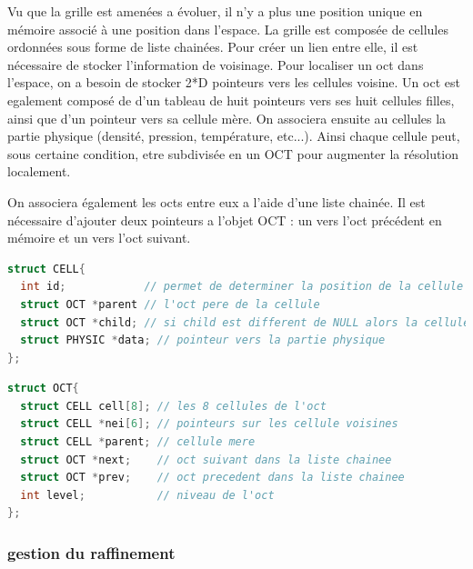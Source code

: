 Vu que la grille est amenées a évoluer, il n'y a plus une position unique en mémoire associé à une position dans l'espace.
La grille est composée de cellules ordonnées sous forme de liste chainées.
Pour créer un lien entre elle, il est nécessaire de stocker l'information de voisinage.
Pour localiser un oct dans l'espace, on a besoin de stocker 2*D pointeurs vers les cellules voisine.
Un oct est egalement composé de d'un tableau de huit pointeurs vers ses huit cellules filles,  ainsi que d'un pointeur vers sa cellule mère.
On associera ensuite au cellules la partie physique (densité, pression, température, etc...).
Ainsi chaque cellule peut, sous certaine condition, etre subdivisée en un OCT pour augmenter la résolution localement.


On associera également les octs entre eux a l'aide d'une liste chainée. 
Il est nécessaire d'ajouter deux pointeurs a l'objet OCT : un vers l'oct précédent en mémoire et un vers l'oct suivant.

\begin{lstlisting}[float=bth,language=C,frame=tb,caption={les structures cellule de EMMA},label=lst:cell]
struct CELL{
  int id;            // permet de determiner la position de la cellule dans l'oct
  struct OCT *parent // l'oct pere de la cellule
  struct OCT *child; // si child est different de NULL alors la cellule est raffinee et child point vers l'oct enfant
  struct PHYSIC *data; // pointeur vers la partie physique
};
\end{lstlisting}

\begin{lstlisting}[float=bth,language=C,frame=tb,caption={les structures OCT  de EMMA},label=lst:oct]
struct OCT{
  struct CELL cell[8]; // les 8 cellules de l'oct
  struct CELL *nei[6]; // pointeurs sur les cellule voisines
  struct CELL *parent; // cellule mere
  struct OCT *next;    // oct suivant dans la liste chainee
  struct OCT *prev;    // oct precedent dans la liste chainee
  int level;           // niveau de l'oct
};
\end{lstlisting}



\subsubsection{gestion du raffinement}

